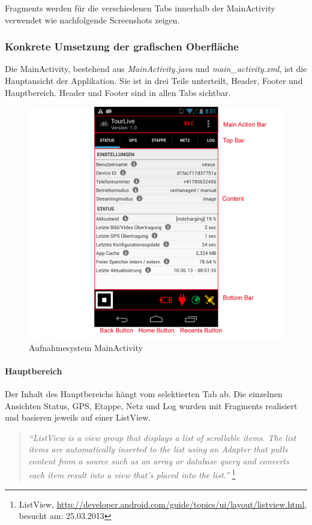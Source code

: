 Fragments werden für die verschiedenen Tabs innerhalb der MainActivity verwendet wie nachfolgende Screenshots zeigen.

\subsubsection{Konkrete Umsetzung der grafischen Oberfläche}
Die MainActivity, bestehend aus \textit{MainActivity.java} und \textit{main\_activity.xml}, ist die Hauptansicht der Applikation. Sie ist in drei Teile unterteilt, Header, Footer und Hauptbereich. Header und Footer sind in allen Tabs sichtbar.

\begin{figure}[H]
	\centering
	\includegraphics[width=120mm]{images/android/status.png}
	\caption{Aufnahmesystem MainActivity}
\end{figure}

\paragraph{Hauptbereich}
Der Inhalt des Hauptbereichs hängt vom selektierten Tab ab. Die einzelnen Ansichten Status, GPS, Etappe, Netz und Log wurden mit Fragments realisiert und basieren jeweils auf einer ListView.

\begin{quotation}
\textit{``ListView is a view group that displays a list of scrollable items. The list items are automatically inserted to the list using an Adapter that pulls content from a source such as an array or database query and converts each item result into a view that's placed into the list.''} \footnote{ListView, \url{http://developer.android.com/guide/topics/ui/layout/listview.html}, besucht am: 25.03.2013}
\end{quotation}

